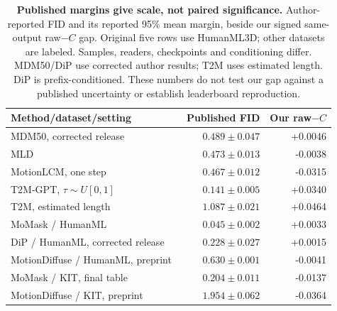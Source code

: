 \begin{table}[t]
\centering\footnotesize
\caption{\textbf{Published margins give scale, not paired significance.} Author-reported FID and its reported 95\% mean margin, beside our signed same-output raw$-C$ gap. Original five rows use HumanML3D; other datasets are labeled. Samples, readers, checkpoints and conditioning differ. MDM50/DiP use corrected author results; T2M uses estimated length. DiP is prefix-conditioned. These numbers do not test our gap against a published uncertainty or establish leaderboard reproduction.}\label{tab:publishedscale}
\begin{tabular}{@{}lrr@{}}\toprule
Method/dataset/setting&Published FID&Our raw$-C$\\\midrule
MDM50, corrected release~\cite{tevet2023}&$0.489\pm0.047$&+0.0046\\
MLD~\cite{mld2023}&$0.473\pm0.013$&-0.0038\\
MotionLCM, one step~\cite{motionlcm2024}&$0.467\pm0.012$&-0.0315\\
T2M-GPT, $\tau\sim U[0,1]$~\cite{t2mgpt2023}&$0.141\pm0.005$&+0.0340\\
T2M, estimated length~\cite{guo2022}&$1.087\pm0.021$&+0.0464\\
MoMask / HumanML~\cite{momask2024}&$0.045\pm0.002$&+0.0033\\
DiP / HumanML, corrected release~\cite{closd2025}&$0.228\pm0.027$&+0.0015\\
MotionDiffuse / HumanML, preprint~\cite{motiondiffuse2024}&$0.630\pm0.001$&-0.0041\\
MoMask / KIT, final table~\cite{momask2024}&$0.204\pm0.011$&-0.0137\\
MotionDiffuse / KIT, preprint~\cite{motiondiffuse2024}&$1.954\pm0.062$&-0.0364\\
\bottomrule\end{tabular}\end{table}
